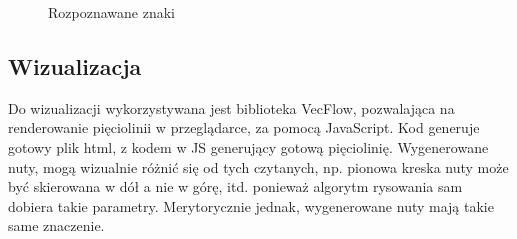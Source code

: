 \documentclass[a4paper,11pt]{article}
\begin{document}
\begin{figure}
{	\hspace*{16pt}
}\hfill
{}\hfill
{}\hfill
{}
\caption{Rozpoznawane znaki}
\label{fig:crops}
\end{figure}

\subsection{Wizualizacja}
Do wizualizacji wykorzystywana jest biblioteka VecFlow, pozwalająca na renderowanie pięciolinii w przeglądarce, za pomocą JavaScript.
Kod generuje gotowy plik html, z kodem w JS generujący gotową pięciolinię.
Wygenerowane nuty, mogą wizualnie różnić się od tych czytanych,
np. pionowa kreska nuty może być skierowana w dół a nie w górę, itd. ponieważ algorytm rysowania sam dobiera takie parametry.
Merytorycznie jednak, wygenerowane nuty mają takie same znaczenie.



\end{document}
